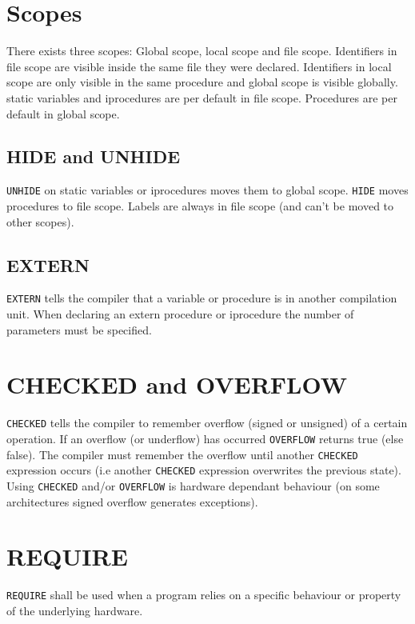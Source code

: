 \section{Scopes}

There exists three scopes: Global scope, local scope and file scope. Identifiers in file scope are visible inside the same file they were declared.
Identifiers in local scope are only visible in the same procedure and global scope is visible globally. static variables and iprocedures are per default in file scope. Procedures are per default in global scope.

\subsection{HIDE and UNHIDE}

\verb|UNHIDE| on static variables or iprocedures moves them to global scope. \verb|HIDE| moves procedures to file scope. Labels are always in file scope (and can't
be moved to other scopes). 

\subsection{EXTERN}

\verb|EXTERN| tells the compiler that a variable or procedure is in another compilation unit. When declaring an extern procedure or iprocedure the number of parameters
must be specified. 

\section{CHECKED and OVERFLOW}

\verb|CHECKED| tells the compiler to remember overflow (signed or unsigned) of a certain operation. If an overflow (or underflow) has occurred \verb|OVERFLOW| returns true (else false). The compiler must remember the overflow until another \verb|CHECKED| expression occurs (i.e another \verb|CHECKED| expression overwrites the previous state). 
Using \verb|CHECKED| and/or \verb|OVERFLOW| is hardware dependant behaviour (on some architectures signed overflow generates exceptions). 

\section{REQUIRE}

\verb|REQUIRE| shall be used when a program relies on a specific behaviour or property of the underlying hardware.

